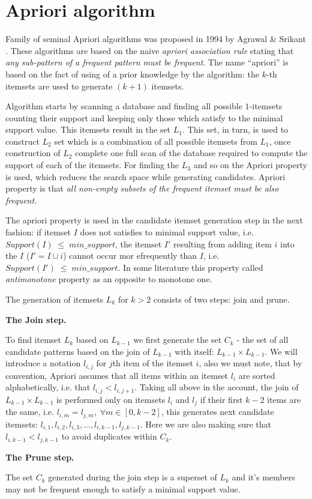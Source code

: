\section{Apriori algorithm}

Family of seminal Apriori algorithms was proposed in 1994 by Agrawal \& Srikant \cite{citeulike:775528}. These algorithms are based on the naive \textit{apriori association rule} stating that \textit{any sub-pattern of a frequent pattern must be frequent}. The name ``apriori'' is based on the fact of using of a prior knowledge by the algorithm: the $k$-th itemsets are used to generate $(k+1)$ itemsets.

Algorithm starts by scanning a database and finding all possible $1$-itemsets counting their support and keeping only those which satisfy to the minimal support value. This itemsets result in the set $L_{1}$. This set, in turn, is used to construct $L_{2}$ set which is a combination of all possible itemsets from $L_{1}$, once construction of $L_{2}$ complete one full scan of the database required to compute the support of each of the itemsets. For finding the $L_{3}$ and so on the Apriori property is used, which reduces the search space while generating candidates. Apriori property is that \textit{all non-empty subsets of the frequent itemset must be also frequent}.

The apriori property is used in the candidate itemset generation step in the next fashion: if itemset $I$ does not satisfies to minimal support value, i.e. $Support(I) \; \leq \; min\_support$, the itemset $I'$ resulting from adding item $i$ into the $I$ ($I' = I \cup i$) cannot occur mor efrequently than $I$, i.e. $Support(I') \; \leq \; min\_support$. In some literature this property called \textit{antimonotone} property as an opposite to monotone one.

The generation of itemsets $L_{k}$ for $k > 2$ consists of two steps: join and prune.

\textbf{The Join step.}

To find itemset $L_{k}$ based on $L_{k-1}$ we first generate the set $C_{k}$ - the set of all candidate patterns based on the join of $L_{k-1}$ with itself: $L_{k-1} \times L_{k-1}$. We will introduce a notation $l_{i,j}$ for $j$th item of the itemset $i$, also we must note, that by convention, Apriori assumes that all items within an itemset $l_{i}$ are sorted alphabetically, i.e. that $l_{i,j} < l_{i,j+1}$. Taking all above in the account, the join of $L_{k-1} \times L_{k-1}$ is performed only on itemsets $l_{i}$ and $l_{j}$ if their first $k-2$ items are the same, i.e. $l_{i,m} = l_{j,m}, \; \forall m \in [0,k-2]$, this generates next candidate itemsets: ${l_{i,1},l_{i,2},l_{i,3},...,l_{i,k-1},l_{j,k-1}}$. Here we are also making sure that $l_{i,k-1} < l_{j,k-1}$ to avoid duplicates within $C_{k}$.

\textbf{The Prune step.}

The set $C_{k}$ generated during the join step is a superset of $L_{k}$ and it's members may not be frequent enough to satisfy a minimal support value.
